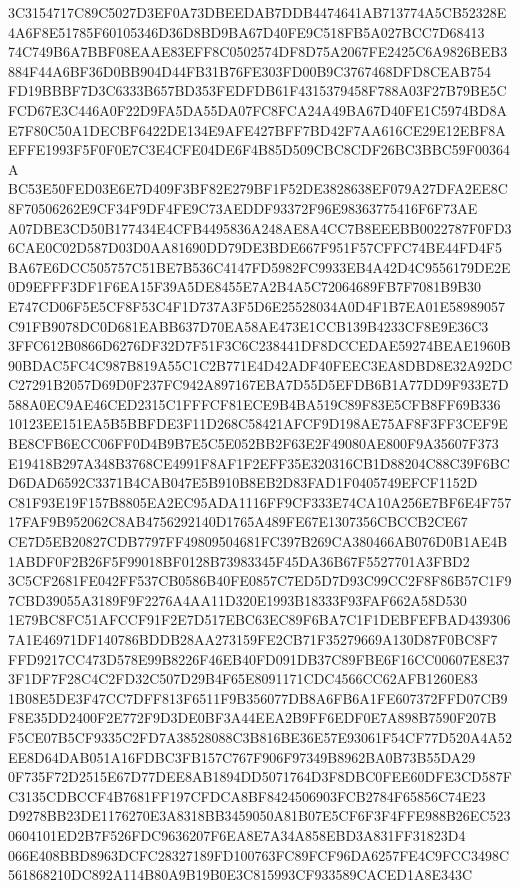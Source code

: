 \documentclass[UTF8,fontset=fandol,zihao=-4,a4paper]{ctexart}
\begin{document}
{{3C3154717C89C5027D3EF0A73DBEEDAB7DDB4474641AB713774A5CB52328E4A6F8E51785F60105346D36D8BD9BA67D40FE9C518FB5A027BCC7D68413
74C749B6A7BBF08EAAE83EFF8C0502574DF8D75A2067FE2425C6A9826BEB3884F44A6BF36D0BB904D44FB31B76FE303FD00B9C3767468DFD8CEAB754
FD19BBBF7D3C6333B657BD353FEDFDB61F4315379458F788A03F27B79BE5CFCD67E3C446A0F22D9FA5DA55DA07FC8FCA24A49BA67D40FE1C5974BD8A
E7F80C50A1DECBF6422DE134E9AFE427BFF7BD42F7AA616CE29E12EBF8AEFFE1993F5F0F0E7C3E4CFE04DE6F4B85D509CBC8CDF26BC3BBC59F00364A
BC53E50FED03E6E7D409F3BF82E279BF1F52DE3828638EF079A27DFA2EE8C8F70506262E9CF34F9DF4FE9C73AEDDF93372F96E98363775416F6F73AE
A07DBE3CD50B177434E4CFB4495836A248AE8A4CC7B8EEEBB0022787F0FD36CAE0C02D587D03D0AA81690DD79DE3BDE667F951F57CFFC74BE44FD4F5
BA67E6DCC505757C51BE7B536C4147FD5982FC9933EB4A42D4C9556179DE2E0D9EFFF3DF1F6EA15F39A5DE8455E7A2B4A5C72064689FB7F7081B9B30
E747CD06F5E5CF8F53C4F1D737A3F5D6E25528034A0D4F1B7EA01E58989057C91FB9078DC0D681EABB637D70EA58AE473E1CCB139B4233CF8E9E36C3
3FFC612B0866D6276DF32D7F51F3C6C238441DF8DCCEDAE59274BEAE1960B90BDAC5FC4C987B819A55C1C2B771E4D42ADF40FEEC3EA8DBD8E32A92DC
C27291B2057D69D0F237FC942A897167EBA7D55D5EFDB6B1A77DD9F933E7D588A0EC9AE46CED2315C1FFFCF81ECE9B4BA519C89F83E5CFB8FF69B336
10123EE151EA5B5BBFDE3F11D268C58421AFCF9D198AE75AF8F3FF3CEF9EBE8CFB6ECC06FF0D4B9B7E5C5E052BB2F63E2F49080AE800F9A35607F373
E19418B297A348B3768CE4991F8AF1F2EFF35E320316CB1D88204C88C39F6BCD6DAD6592C3371B4CAB047E5B910B8EB2D83FAD1F0405749EFCF1152D
C81F93E19F157B8805EA2EC95ADA1116FF9CF333E74CA10A256E7BF6E4F75717FAF9B952062C8AB4756292140D1765A489FE67E1307356CBCCB2CE67
CE7D5EB20827CDB7797FF49809504681FC397B269CA380466AB076D0B1AE4B1ABDF0F2B26F5F99018BF0128B73983345F45DA36B67F5527701A3FBD2
3C5CF2681FE042FF537CB0586B40FE0857C7ED5D7D93C99CC2F8F86B57C1F97CBD39055A3189F9F2276A4AA11D320E1993B18333F93FAF662A58D530
1E79BC8FC51AFCCF91F2E7D517EBC63EC89F6BA7C1F1DEBFEFBAD4393067A1E46971DF140786BDDB28AA273159FE2CB71F35279669A130D87F0BC8F7
FFD9217CC473D578E99B8226F46EB40FD091DB37C89FBE6F16CC00607E8E373F1DF7F28C4C2FD32C507D29B4F65E8091171CDC4566CC62AFB1260E83
1B08E5DE3F47CC7DFF813F6511F9B356077DB8A6FB6A1FE607372FFD07CB9F8E35DD2400F2E772F9D3DE0BF3A44EEA2B9FF6EDF0E7A898B7590F207B
F5CE07B5CF9335C2FD7A38528088C3B816BE36E57E93061F54CF77D520A4A52EE8D64DAB051A16FDBC3FB157C767F906F97349B8962BA0B73B55DA29
0F735F72D2515E67D77DEE8AB1894DD5071764D3F8DBC0FEE60DFE3CD587FC3135CDBCCF4B7681FF197CFDCA8BF8424506903FCB2784F65856C74E23
D9278BB23DE1176270E3A8318BB3459050A81B07E5CF6F3F4FFE988B26EC5230604101ED2B7F526FDC9636207F6EA8E7A34A858EBD3A831FF31823D4
066E408BBD8963DCFC28327189FD100763FC89FCF96DA6257FE4C9FCC3498C561868210DC892A114B80A9B19B0E3C815993CF933589CACED1A8E343C
}}
\end{document}
